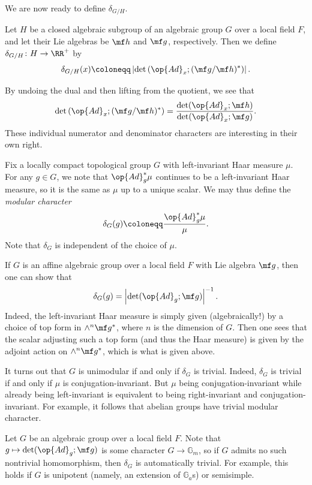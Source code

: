 \documentclass[../notes.tex]{subfiles}
\begin{document}
We are now ready to define $\delta_{G/H}$.
\begin{definition}
	Let $H$ be a closed algebraic subgroup of an algebraic group $G$ over a local field $F$, and let their Lie algebras be $\mf h$ and $\mf g$, respectively. Then we define $\delta_{G/H}\colon H\to\RR^+$ by
	\[\delta_{G/H}(x)\coloneqq\left|\det\left(\op{Ad}_x;(\mf g/\mf h)^*\right)\right|.\]
\end{definition}
By undoing the dual and then lifting from the quotient, we see that
\[\det\left(\op{Ad}_x;(\mf g/\mf h)^*\right)=\frac{\det(\op{Ad}_x;\mf h)}{\det(\op{Ad}_x;\mf g)}.\]
These individual numerator and denominator characters are interesting in their own right.
\begin{definition}
	Fix a locally compact topological group $G$ with left-invariant Haar measure $\mu$. For any $g\in G$, we note that $\op{Ad}_g^*\mu$ continues to be a left-invariant Haar measure, so it is the same as $\mu$ up to a unique scalar. We may thus define the \textit{modular character}
	\[\delta_G(g)\coloneqq\frac{\op{Ad}_g^*\mu}{\mu}.\]
	Note that $\delta_G$ is independent of the choice of $\mu$.
\end{definition}
\begin{remark}
	If $G$ is an affine algebraic group over a local field $F$ with Lie algebra $\mf g$, then one can show that
	\[\delta_G(g)=\left|\det(\op{Ad}_g;\mf g)\right|^{-1}.\]
	Indeed, the left-invariant Haar measure is simply given (algebraically!) by a choice of top form in $\land^n\mf g^*$, where $n$ is the dimension of $G$. Then one sees that the scalar adjusting such a top form (and thus the Haar measure) is given by the adjoint action on $\land^n\mf g^*$, which is what is given above.
\end{remark}
\begin{remark}
	It turns out that $G$ is unimodular if and only if $\delta_G$ is trivial. Indeed, $\delta_G$ is trivial if and only if $\mu$ is conjugation-invariant. But $\mu$ being conjugation-invariant while already being left-invariant is equivalent to being right-invariant and conjugation-invariant. For example, it follows that abelian groups have trivial modular character.
\end{remark}
\begin{example}
	Let $G$ be an algebraic group over a local field $F$. Note that $g\mapsto\det(\op{Ad}_g;\mf g)$ is some character $G\to\mathbb G_m$, so if $G$ admits no such nontrivial homomorphism, then $\delta_G$ is automatically trivial. For example, this holds if $G$ is unipotent (namely, an extension of $\mathbb G_a$s) or semisimple.
\end{example}
\end{document}
